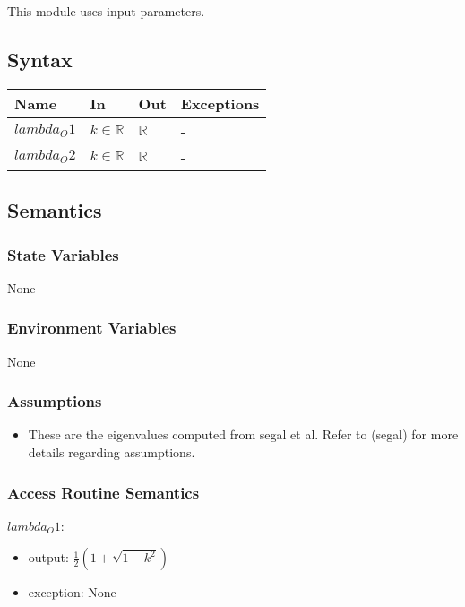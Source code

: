 \documentclass[12pt, titlepage]{article}
\begin{document}
This module uses input parameters. 

\subsection{Syntax}

\begin{center}
	\begin{tabular}{p{3cm} p{3cm} p{3cm} >{\raggedright\arraybackslash}p{7cm}}
		\toprule
		\textbf{Name} & \textbf{In} & \textbf{Out} & \textbf{Exceptions} \\
		\hline
		$lambda_O1$ & $k \in \mathbb{R}$ & $\mathbb{R}$ & - \\
		$lambda_O2$ & $k \in \mathbb{R}$ & $\mathbb{R}$ & - \\ 
		\hline
	\end{tabular}
\end{center}

\subsection{Semantics}

\subsubsection{State Variables}

None

\subsubsection{Environment Variables}

None

\subsubsection{Assumptions}

\begin{itemize}
	\item These are the eigenvalues computed from segal et al. Refer to (segal) 
	for more details regarding assumptions.
\end{itemize}

\subsubsection{Access Routine Semantics}


$lambda_O1$:
\begin{itemize}
	\item output: $\frac{1}{2} (1+\sqrt{1-k^{2}})$ 
	\item exception: None
\end{itemize}
\end{document}

